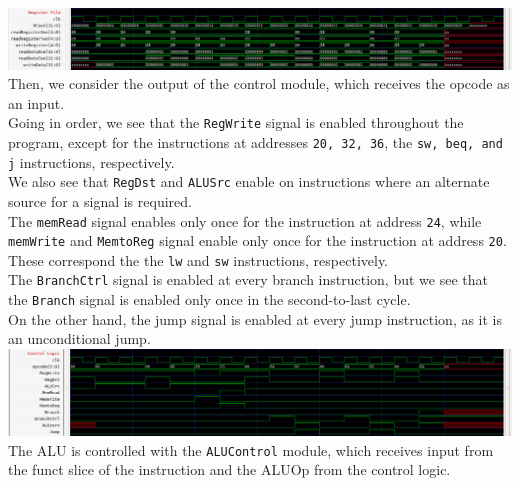 \documentclass[twocolumn]{article}
\newcommand{\cc}[1]{\texttt{#1}}
\begin{document}
\begingroup
    \centering
    \medskip
    \includegraphics[width=\columnwidth]{Lab-Tex/Lab5-images/p2.png}
    \medskip
\endgroup
\\

Then, we consider the output of the control module, which receives the opcode as an input. \\

Going in order, we see that the \cc{RegWrite} signal is enabled throughout the program, except for the instructions at addresses \cc{20, 32, 36}, the \cc{sw, beq, and j} instructions, respectively. \\

We also see that \cc{RegDst} and \cc{ALUSrc} enable on instructions where an alternate source for a signal is required. \\ 

The \cc{memRead} signal enables only once for the instruction at address \cc{24}, while \cc{memWrite}  and \cc{MemtoReg} signal enable only once for the instruction at address \cc{20}. These correspond the the \cc{lw} and \cc{sw} instructions, respectively.\\

The \cc{BranchCtrl} signal is enabled at every branch instruction, but we see that the \cc{Branch} signal is enabled only once in the second-to-last cycle.\\

On the other hand, the jump signal is enabled at every jump instruction, as it is an unconditional jump.\\

\begingroup
    \centering
    \medskip
    \includegraphics[width=\columnwidth]{Lab-Tex/Lab5-images/p3.png}
    \medskip
\endgroup
\\

The ALU is controlled with the \cc{ALUControl} module, which receives input from the funct slice of the instruction and the ALUOp from the control logic. \\
\end{document}
